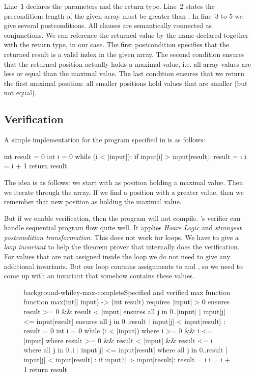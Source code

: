 Line~1 declares the parameters and the return type.
Line~2 states the precondition: length of the given array must be greater than .
In line~3 to 5 we give several postconditions.
All  clauses are semantically connected as conjunctions.
We can reference the returned value by the name declared together with the return type,  in our case.
The first postcondition specifies that the returned result is a valid index in the given array.
The second condition ensures that the returned position actually holds a maximal value, i.e. all array values are less or equal than the maximal value.
The last condition ensures that we return the first maximal position: all smaller positions hold values that are smaller (but not equal).


\subsection{Verification}\label{section:whiley-verification}

A simple implementation for the program specified in  is as follows:
\begin{whileycode}
int result = 0
int i = 0
while (i < |input|):
	if input[i] > input[result]:
		result = i
	i = i + 1
return result
\end{whileycode}

\FloatBarrier

The idea is as follows: we start with  as position holding a maximal value.
Then we iterate through the array.
If we find a position with a greater value, then we remember that new position as holding the maximal value.

But if we enable verification, then the program will not compile.
\whiley's verifier can handle sequential program flow quite well.
It applies \emph{Hoare Logic} and \emph{strongest postcondition transformation}.
This does not work for loops.
We have to give a \emph{loop invariant} to help the theorem prover that internally does the verification.
For values that are not assigned inside the loop we do not need to give any additional invariants.
But our loop contains assignments to  and , so we need to come up with an invariant that somehow contains these values.

\begin{figure}[!b]
\begin{whileycodec}{background-whiley-max-complete}{Specified and verified max function}
function max(int[] input) -> (int result)
requires |input| > 0
ensures result >= 0 && result < |input|
ensures all { j in 0..|input| | input[j] <= input[result] }
ensures all { j in 0..result  | input[j] <  input[result] }:
    result = 0
    int i = 0
    while (i < |input|)
    where i >= 0 && i <= |input|
    where result >= 0 && result < |input| && result <= i
    where all { j in 0..i       | input[j] <= input[result] }
    where all { j in 0..result  | input[j] <  input[result] }:
        if input[i] > input[result]:
            result = i
        i = i + 1
    return result
\end{whileycodec}
\end{figure}

